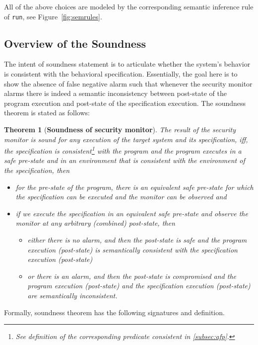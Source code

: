 \documentclass[conference]{IEEEtran}
\newtheorem{thm}{Theorem}
\begin{document}
All of the above choices are modeled by the corresponding semantic inference rule of \texttt{run}, see Figure~\ref{fig:semrules}.
\subsection{Overview of the Soundness}\label{subsec:soundness}
The intent of soundness statement is to articulate whether the system's behavior is consistent with the behavioral specification. Essentially, the goal here is to show the absence of false negative alarm such that whenever the security monitor alarms there is indeed a semantic inconsistency between post-state of the program execution and post-state of the specification execution. The soundness theorem is stated as follows:

\begin{thm}[\textbf{Soundness of security monitor}]\label{soundness} 
The result of the security monitor is sound for any execution of the target system and its specification, iff, the specification is consistent\footnote[4]{See definition of the corresponding predicate \emph{consistent} in \cref{subsec:afp}.} with the program and the program executes in a safe pre-state and in an environment that is consistent with the environment of the specification, then \begin{itemize}
\item for the pre-state of the program, there is an equivalent safe pre-state for which the specification can be executed and the monitor can be observed and
\item if we execute the specification in an equivalent safe pre-state and observe the monitor at any arbitrary (combined) post-state, then 
\begin{itemize}
\item either there is no alarm, and then the post-state is safe and the program execution (post-state) is semantically consistent with the specification execution (post-state)
\item or there is an alarm, and then the post-state is compromised and the program execution (post-state) and the specification execution (post-state) are semantically inconsistent.
\end{itemize} 
\end{itemize}
\end{thm}


Formally, soundness theorem has the following signatures and definition.
\end{document}
